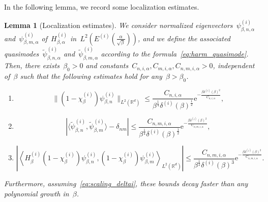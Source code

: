 \documentclass[10pt]{article}
\newcommand{\e}{\mathrm{e}}
\newcommand{\R}{\mathbb{R}}
\newcommand{\1}{\mathbbm 1}
\newcommand{\halfSpace}[1]{E^{(#1)}}
\newcommand{\deltai}{\delta^{(i)}}
\newtheorem{lemma}{Lemma}
\begin{document}
    In the following lemma, we record some localization estimates.
    \begin{lemma}[Localization estimates]
        \label{lemma:localization}
        We consider normalized eigenvectors~$\psi_{\beta,n,\alpha}^{(i)}$ and~$\psi_{\beta,m,\alpha}^{(i)}$ of~$H^{(i)}_{\beta,\alpha}$ in~$L^2\left(\halfSpace{i}(\frac{\alpha}{\sqrt\beta})\right)$, and we define the associated quasimodes~$\widetilde\psi_{\beta,n,\alpha}^{(i)}$ and~$\widetilde\psi_{\beta,m,\alpha}^{(i)}$ according to the formula~\eqref{eq:harm_quasimode}.
        Then, there exists~$\beta_0>0$ and constants~$C_{n,i,\alpha},C_{m,i,\alpha},C_{n,m,i,\alpha}>0$, independent of~$\beta$ such that the following estimates hold for any~$\beta>\beta_0$.
        \begin{enumerate}[]
            \item{\begin{equation}\label{eq:loc_eqa}\|(1-\chi_\beta^{(i)})\psi_{\beta,n}^{(i)}\|_{L^2(\R^d)} \leq \frac{C_{n,i,\alpha}}{\beta^{\frac14}\deltai(\beta)^{\frac12}}\e^{-\frac{\beta\deltai(\beta)^2}{C_{n,i,\alpha}}},\end{equation}}
            \item{\begin{equation}\label{eq:loc_eqb}\left|\langle \widetilde\psi_{\beta,n}^{(i)},\widetilde\psi_{\beta,m}^{(i)}\rangle-\delta_{nm}\right| \leq  \frac{C_{n,m,i,\alpha}}{\beta^{\frac14}\deltai(\beta)^{\frac12}}\e^{-\frac{\beta\deltai(\beta)^2}{C_{n,m,i,\alpha}}},\end{equation}}
            \item{\begin{equation}\label{eq:loc_eqc}\left|\left\langle H_\beta^{(i)}(1-\chi_\beta^{(i)})\psi_{\beta,n}^{(i)},(1-\chi_\beta^{(i)})\psi_{\beta,m}^{(i)}\right\rangle_{L^2(\R^d)}\right|\leq \frac{C_{n,m,i,\alpha}}{\beta^{\frac12}\deltai(\beta)^{3}}\e^{-\frac{\beta\deltai(\beta)^2}{C_{n,m,i,\alpha}}}.\end{equation}}
        \end{enumerate}
        
        Furthermore, assuming~\eqref{eq:scaling_deltai}, these bounds decay faster than any polynomial growth in~$\beta$.
    \end{lemma}
\end{document}
